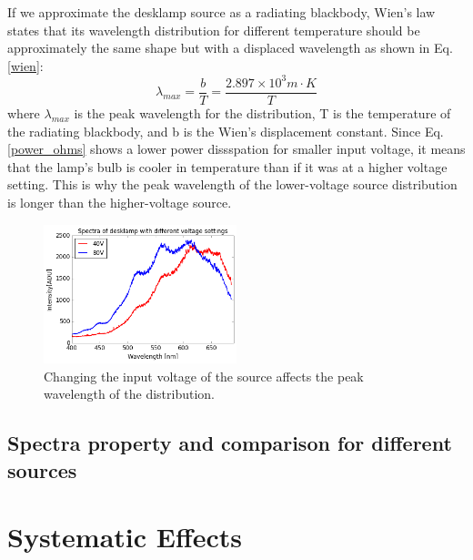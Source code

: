 \documentclass[authoryear, 12pt,5p, times]{elsarticle}
\begin{document}
If we approximate the desklamp source as a radiating blackbody, Wien's law states that its wavelength distribution for different temperature should be approximately the same shape but with a displaced wavelength as shown in Eq.\ref{wien}:
		\begin{equation}
		\lambda_{max} = \frac{b}{T}=\frac{2.897\times 10^3 m\cdot K}{T}
		\label{wien}
		\end{equation}
		where $\lambda_{max}$ is the peak wavelength for the distribution, T is the temperature of the radiating blackbody, and b is the Wien's displacement constant.
		Since Eq. \ref{power_ohms} shows a lower power dissspation for smaller input voltage, it means that the lamp's bulb is cooler in temperature than if it was at a higher voltage setting. This is why the peak wavelength of the  lower-voltage source distribution is longer than the higher-voltage source. %
	\begin{figure}[h!]
	\includegraphics[width=0.5\textwidth]{figures/voltage}
\caption{Changing the input voltage of the source affects the peak wavelength of the distribution. }
\label{voltage}
	\end{figure}
\subsection{Spectra property and comparison for different sources}
\section{Systematic Effects}
\end{document}
